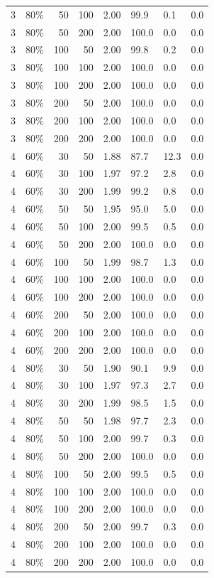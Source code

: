 \begin{table}[ht]
\begin{tabular}{rlrrllll}
  3 & 80\% & 50 & 100 & 2.00 & 99.9 & 0.1 & 0.0 \\ 
  3 & 80\% & 50 & 200 & 2.00 & 100.0 & 0.0 & 0.0 \\ 
  3 & 80\% & 100 & 50 & 2.00 & 99.8 & 0.2 & 0.0 \\ 
  3 & 80\% & 100 & 100 & 2.00 & 100.0 & 0.0 & 0.0 \\ 
  3 & 80\% & 100 & 200 & 2.00 & 100.0 & 0.0 & 0.0 \\ 
  3 & 80\% & 200 & 50 & 2.00 & 100.0 & 0.0 & 0.0 \\ 
  3 & 80\% & 200 & 100 & 2.00 & 100.0 & 0.0 & 0.0 \\ 
  3 & 80\% & 200 & 200 & 2.00 & 100.0 & 0.0 & 0.0 \\ 
  4 & 60\% & 30 & 50 & 1.88 & 87.7 & 12.3 & 0.0 \\ 
  4 & 60\% & 30 & 100 & 1.97 & 97.2 & 2.8 & 0.0 \\ 
  4 & 60\% & 30 & 200 & 1.99 & 99.2 & 0.8 & 0.0 \\ 
  4 & 60\% & 50 & 50 & 1.95 & 95.0 & 5.0 & 0.0 \\ 
  4 & 60\% & 50 & 100 & 2.00 & 99.5 & 0.5 & 0.0 \\ 
  4 & 60\% & 50 & 200 & 2.00 & 100.0 & 0.0 & 0.0 \\ 
  4 & 60\% & 100 & 50 & 1.99 & 98.7 & 1.3 & 0.0 \\ 
  4 & 60\% & 100 & 100 & 2.00 & 100.0 & 0.0 & 0.0 \\ 
  4 & 60\% & 100 & 200 & 2.00 & 100.0 & 0.0 & 0.0 \\ 
  4 & 60\% & 200 & 50 & 2.00 & 100.0 & 0.0 & 0.0 \\ 
  4 & 60\% & 200 & 100 & 2.00 & 100.0 & 0.0 & 0.0 \\ 
  4 & 60\% & 200 & 200 & 2.00 & 100.0 & 0.0 & 0.0 \\ 
  4 & 80\% & 30 & 50 & 1.90 & 90.1 & 9.9 & 0.0 \\ 
  4 & 80\% & 30 & 100 & 1.97 & 97.3 & 2.7 & 0.0 \\ 
  4 & 80\% & 30 & 200 & 1.99 & 98.5 & 1.5 & 0.0 \\ 
  4 & 80\% & 50 & 50 & 1.98 & 97.7 & 2.3 & 0.0 \\ 
  4 & 80\% & 50 & 100 & 2.00 & 99.7 & 0.3 & 0.0 \\ 
  4 & 80\% & 50 & 200 & 2.00 & 100.0 & 0.0 & 0.0 \\ 
  4 & 80\% & 100 & 50 & 2.00 & 99.5 & 0.5 & 0.0 \\ 
  4 & 80\% & 100 & 100 & 2.00 & 100.0 & 0.0 & 0.0 \\ 
  4 & 80\% & 100 & 200 & 2.00 & 100.0 & 0.0 & 0.0 \\ 
  4 & 80\% & 200 & 50 & 2.00 & 99.7 & 0.3 & 0.0 \\ 
  4 & 80\% & 200 & 100 & 2.00 & 100.0 & 0.0 & 0.0 \\ 
  4 & 80\% & 200 & 200 & 2.00 & 100.0 & 0.0 & 0.0 \\ 
   \hline
\end{tabular}
\end{table}
